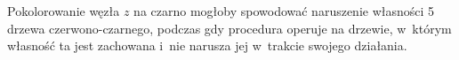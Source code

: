 
\exercise %
Pokolorowanie węzła $z$ na czarno mogłoby spowodować naruszenie własności 5 drzewa czerwono-czarnego, podczas gdy procedura  operuje na drzewie, w~którym własność ta jest zachowana i~nie narusza jej w~trakcie swojego działania.

\exercise %
\exercise %
\exercise %
\exercise %
\exercise %
